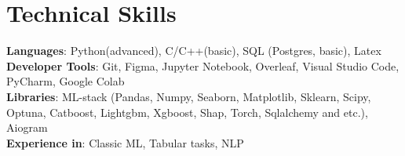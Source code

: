 \documentclass[letterpaper,11pt]{article}
\begin{document}
\section{Technical Skills}
 \begin{itemize}[leftmargin=0.15in, label={}]
    \small{\item{
     \textbf{Languages}{: Python(advanced), C/C++(basic), SQL (Postgres, basic), Latex} \\
     \textbf{Developer Tools}{: Git, Figma, Jupyter Notebook, Overleaf, Visual Studio Code, PyCharm, Google Colab} \\
     \textbf{Libraries}{: ML-stack (Pandas, Numpy, Seaborn, Matplotlib, Sklearn, Scipy, Optuna, Catboost, Lightgbm, Xgboost, Shap, Torch, Sqlalchemy and etc.), Aiogram}\\
     \textbf{Experience in}{: Classic ML, Tabular tasks, NLP}
     }}
 \end{itemize}


\end{document}
